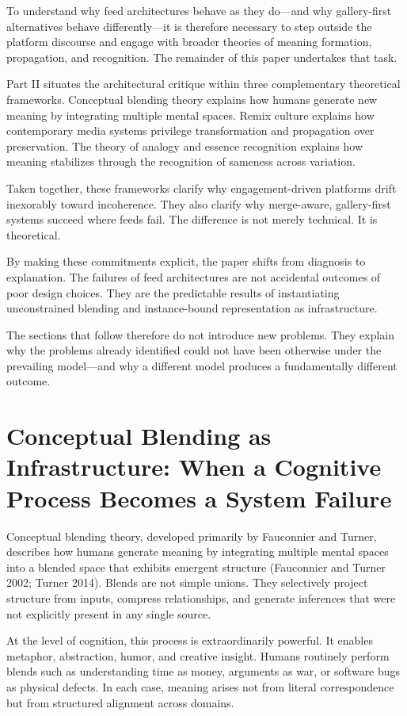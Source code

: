 \documentclass[11pt,oneside]{article}
\begin{document}
To understand why feed architectures behave as they do—and why gallery-first alternatives behave differently—it is therefore necessary to step outside the platform discourse and engage with broader theories of meaning formation, propagation, and recognition. The remainder of this paper undertakes that task.

Part II situates the architectural critique within three complementary theoretical frameworks. Conceptual blending theory explains how humans generate new meaning by integrating multiple mental spaces. Remix culture explains how contemporary media systems privilege transformation and propagation over preservation. The theory of analogy and essence recognition explains how meaning stabilizes through the recognition of sameness across variation.

Taken together, these frameworks clarify why engagement-driven platforms drift inexorably toward incoherence. They also clarify why merge-aware, gallery-first systems succeed where feeds fail. The difference is not merely technical. It is theoretical.

By making these commitments explicit, the paper shifts from diagnosis to explanation. The failures of feed architectures are not accidental outcomes of poor design choices. They are the predictable results of instantiating unconstrained blending and instance-bound representation as infrastructure.

The sections that follow therefore do not introduce new problems. They explain why the problems already identified could not have been otherwise under the prevailing model—and why a different model produces a fundamentally different outcome.

\section{Conceptual Blending as Infrastructure: When a Cognitive Process Becomes a System Failure}

Conceptual blending theory, developed primarily by Fauconnier and Turner, describes how humans generate meaning by integrating multiple mental spaces into a blended space that exhibits emergent structure (Fauconnier and Turner 2002; Turner 2014). Blends are not simple unions. They selectively project structure from inputs, compress relationships, and generate inferences that were not explicitly present in any single source.

At the level of cognition, this process is extraordinarily powerful. It enables metaphor, abstraction, humor, and creative insight. Humans routinely perform blends such as understanding time as money, arguments as war, or software bugs as physical defects. In each case, meaning arises not from literal correspondence but from structured alignment across domains.
\end{document}
